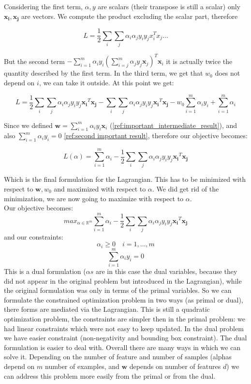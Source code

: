Considering the first term, $\alpha, y$ are scalars (their transpose is still a scalar)
only $\pmb{x_i}, \pmb{x_j}$ are vectors. We compute the product excluding the scalar
part, therefore

\[
	L = \frac{1}{2}\sum_{i}\sum_{j}\alpha_{i}\alpha_{j}y_{i}y_{j}x_{i}^{T}x_{j}\dots
\]

But the second term
$-\sum_{i=1}^{m}\alpha_{i}y_{i}(\sum_{i=j}^{m}\alpha_{j}y_{j}\pmb{x}_{j})^{T}\pmb
{x}_{i}$
it is actually twice the quantity described by the first term. In the third term,
we get that $w_{0}$ does not depend on $i$, we can take it outside. At this
point we get:

\[
	L = \frac{1}{2}\sum_{i}\sum_{j}\alpha_{i}\alpha_{j}y_{i}y_{j}\pmb{x_i}^{T}\pmb{x_j}
	- \sum_{i}\sum_{j}\alpha_{i}\alpha_{j}y_{i}y_{j}\pmb{x_i}^{T}\pmb{x_j}- w_{0}\sum
	_{i=1}^{m}\alpha_{i}y_{i}+ \sum_{i=1}^{m}\alpha_{i}
\]

Since we defined $\pmb{w}= \sum_{i=1}^{m}\alpha_{i}y_{i}\pmb{x}_{i}$ (\ref{ref:important_intermediate_result}),
and also $\sum_{i=1}^{m}\alpha_{i}y_{i}= 0$ \ref{ref:second important result}, therefore
our objective becomes:

\[
	L(\alpha) = \sum_{i=1}^{m}\alpha_{i}- \frac{1}{2}\sum_{i}\sum_{j}\alpha_{i}\alpha
	_{j}y_{i}y_{j}\pmb{x_i}^{T}\pmb{x_j}
\]

Which is the final formulation for the Lagrangian. This has to be minimized with
respect to $\pmb{w}, w_{0}$ and maximized with respect to $\alpha$. We did get
rid of the minimization, we are now going to maximize with respect to $\alpha$.\\

Our objective becomes:
\[
	max_{\alpha \in \mathbb{R}^m}\sum_{i=1}^{m}\alpha_{i}- \frac{1}{2}\sum_{i}\sum_{j}
	\alpha_{i}\alpha_{j}y_{i}y_{j}\pmb{x_i}^{T}\pmb{x_j}
\]
and our constraints:
\[
	\alpha_{i}\geq 0 \quad i = 1, \dots, m
\]
\[
	\sum_{i=1}^{m}\alpha_{i}y_{i}= 0
\]
This is a dual formulation ($\alpha s$ are in this case the dual variables,
because they did not appear in the original problem but introduced in the
Lagrangian), while the original formulation was only in terms of the primal
variables. So we can formulate the constrained optimization problem in two ways (as
primal or dual), there forms are mediated via the Lagrangian. This is still a quadratic
optimization problem, the constraints are simpler then in the primal problem: we
had linear constraints which were not easy to keep updated. In the dual problem
we have easier constraint (non-negativity and bounding box constraint). The dual
formulation is easier to deal with. Overall there are many ways in which we can
solve it. Depending on the number of feature and number of samples (alphas
depend on $m$ number of examples, and $\pmb{w}$ depends on number of features $d$)
we can address this problem more easily from the primal or from the dual. \\

